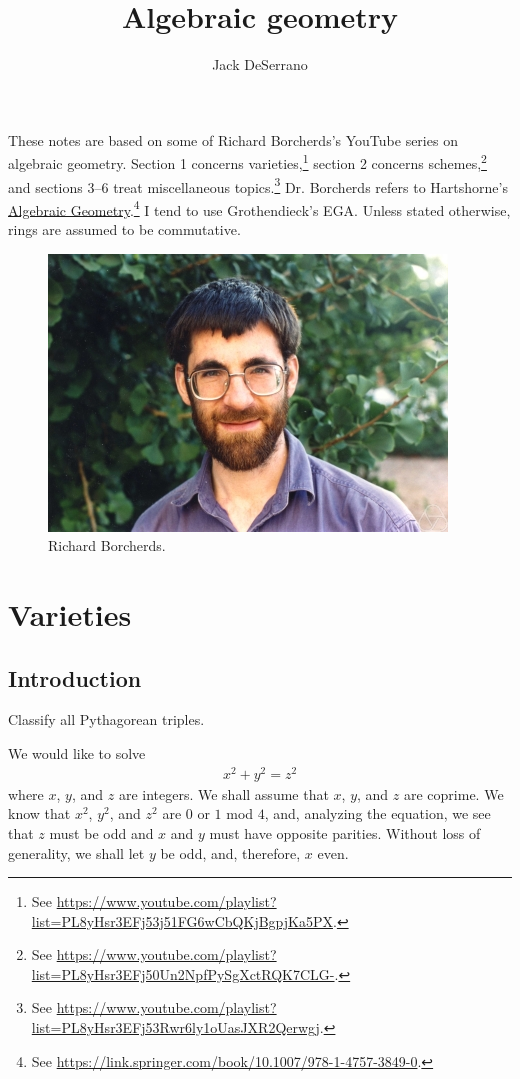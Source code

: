\documentclass [11 pt, oneside] {article}
\title {Algebraic geometry}
\author {Jack DeSerrano}
\begin{document}
\ifams
    \vspace*{\fill}
\fi
\maketitle
These notes are based on some of Richard Borcherds's YouTube series on algebraic geometry. Section 1 concerns varieties,\footnote{See \url{https://www.youtube.com/playlist?list=PL8yHsr3EFj53j51FG6wCbQKjBgpjKa5PX}.} section 2 concerns schemes,\footnote{See \url{https://www.youtube.com/playlist?list=PL8yHsr3EFj50Un2NpfPySgXctRQK7CLG-}.} and sections 3--6 treat miscellaneous topics.\footnote{See \url{https://www.youtube.com/playlist?list=PL8yHsr3EFj53Rwr6ly1oUasJXR2Qerwgj}.} Dr. Borcherds refers to Hartshorne's \ul{Algebraic Geometry}.\footnote{See \url{https://link.springer.com/book/10.1007/978-1-4757-3849-0}.} I tend to use Grothendieck's EGA. Unless stated otherwise, rings are assumed to be commutative.
\tableofcontents
\ifams
	\vspace*{\fill}
\fi


\begin{figure}
\begin{center}
\includegraphics[scale=0.8]{images/borcherds}
\caption{Richard Borcherds.}
\end{center}
\end{figure}
\text{}
\newpage


\section{Varieties}

\subsection{Introduction}
\begin{problem}
	Classify all Pythagorean triples.
\end{problem}
We would like to solve
\begin{align*}
	x^2 + y^2 = z^2
\end{align*}
where $x$, $y$, and $z$ are integers. We shall assume that $x$, $y$, and $z$ are coprime. We know that $x^2$, $y^2$, and $z^2$ are $0$ or $1$ mod $4$, and, analyzing the equation, we see that $z$ must be odd and $x$ and $y$ must have opposite parities. Without loss of generality, we shall let $y$ be odd, and, therefore, $x$ even.
\end{document}
